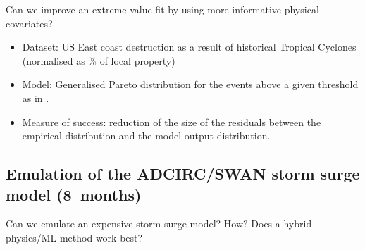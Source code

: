 \documentclass[usenames, dvipsnames]{article}      %
\begin{document}
Can we improve an extreme value fit by 
using more informative physical covariates?

\begin{itemize}
    \item Dataset: US East coast destruction as a result of historical
    Tropical Cyclones (normalised as \% of local property)
    \item Model: Generalised Pareto distribution for the events
    above a given threshold as in \cite{Chavas2013U.S.Perspective}.
    \item Measure of success: reduction of the size of the
    residuals between the empirical distribution and the model
    output distribution.
\end{itemize}

\vspace{-10pt}

\subsection*{Emulation of the ADCIRC/SWAN 
            storm surge model (8~months)}
Can we emulate an expensive storm surge model? How? Does a hybrid
physics/ML method work best?~\cite{Kashinath2021Physics-informedModelling, Guo2021Data-drivenNetworks}
\end{document}
